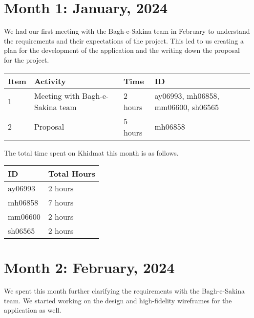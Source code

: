 \documentclass{article}
\begin{document}

\newpage %
\section*{Month 1: January, 2024}

We had our first meeting with the Bagh-e-Sakina team in February to understand the requirements and their expectations of the project. This led to us creating a plan for the development of the application and the writing down the proposal for the project.

\vspace{1em}

\noindent \begin{tabular}{|l|l|l|l|}
  \hline
  Item & Activity     & Time  & ID \\ \hline
  1    & Meeting with Bagh-e-Sakina team & 2 hours  & ay06993, mh06858, mm06600, sh06565 \\ \hline
  2    & Proposal     & 5 hours & mh06858 \\ \hline
\end{tabular}

\vspace{1em}

\noindent The total time spent on Khidmat this month is as follows.

\vspace{1em}

\noindent \begin{tabular}{|l|l|}
  \hline
  ID      & Total Hours \\ \hline
  ay06993 & 2 hours     \\ \hline
  mh06858 & 7 hours     \\ \hline
  mm06600 & 2 hours     \\ \hline
  sh06565 & 2 hours     \\ \hline
\end{tabular}

\newpage %
\section*{Month 2: February, 2024}

We spent this month further clarifying the requirements with the Bagh-e-Sakina team. We started working on the design and high-fidelity wireframes for the application as well. 
\end{document}
